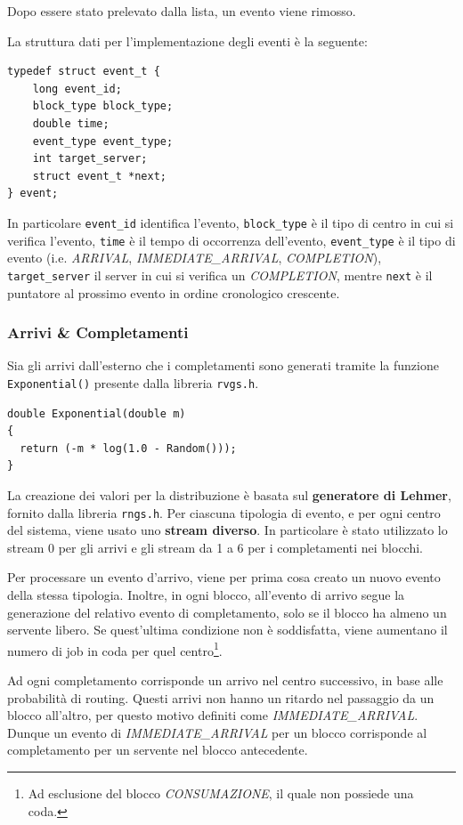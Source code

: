 \documentclass{article}
\begin{document}
Dopo essere stato prelevato dalla lista, un evento viene rimosso. 

La struttura dati per l'implementazione degli eventi è la seguente: 

\begin{lstlisting}
typedef struct event_t {
    long event_id;
    block_type block_type;
    double time;
    event_type event_type;
    int target_server;
    struct event_t *next;
} event;
\end{lstlisting}
In particolare \texttt{event\_id} identifica l'evento, \texttt{block\_type} è il tipo di centro in cui si verifica l'evento, \texttt{time} è il tempo di occorrenza dell'evento, \texttt{event\_type} è il tipo di evento (i.e. \textit{ARRIVAL}, \textit{IMMEDIATE\_ARRIVAL}, \textit{COMPLETION}), \texttt{target\_server} il server in cui si verifica un \textit{COMPLETION}, mentre \texttt{next} è il puntatore al  prossimo evento in ordine cronologico crescente.
\subsubsection{Arrivi \& Completamenti}

Sia gli arrivi dall'esterno che i completamenti sono generati tramite la funzione \texttt{Exponential()} presente dalla libreria \texttt{rvgs.h}. 

\begin{lstlisting}
double Exponential(double m)
{
  return (-m * log(1.0 - Random()));
}
\end{lstlisting}

La creazione dei valori per la distribuzione è basata sul \textbf{generatore di Lehmer}, fornito dalla libreria \texttt{rngs.h}. Per ciascuna tipologia di evento, e per ogni centro del sistema, viene usato uno \textbf{stream diverso}. In particolare è stato utilizzato lo stream 0 per gli arrivi e gli stream da 1 a 6 per i completamenti nei blocchi.

Per processare un evento d'arrivo, viene per prima cosa creato un nuovo evento della stessa tipologia. Inoltre, in ogni blocco, all'evento di arrivo segue la generazione del relativo evento di completamento, solo se il blocco ha almeno un servente libero. Se quest'ultima condizione non è soddisfatta, viene aumentano il numero di job in coda per quel centro\footnote{Ad esclusione del blocco \textit{CONSUMAZIONE}, il quale non possiede una coda.}. 

Ad ogni completamento corrisponde un arrivo nel centro successivo, in base alle probabilità di routing. Questi arrivi non hanno un ritardo nel passaggio da un blocco all'altro, per questo motivo definiti come \textit{IMMEDIATE\_ARRIVAL}. 
Dunque un evento di \textit{IMMEDIATE\_ARRIVAL} per un blocco corrisponde al completamento per un servente nel blocco antecedente. 
\end{document}
